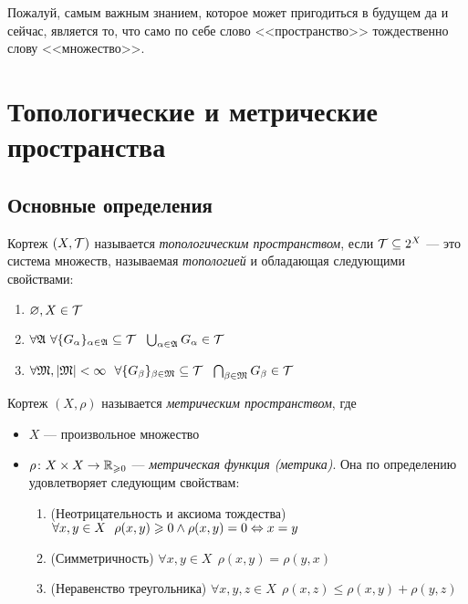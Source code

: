 \begin{anote}
	Пожалуй, самым важным знанием, которое может пригодиться в будущем да и сейчас, является то, что само по себе слово <<пространство>> тождественно слову <<множество>>.
\end{anote}

\section{Топологические и метрические пространства}

\subsection{Основные определения}

\begin{definition}
	Кортеж $(X, \mathcal{T})$ называется \textit{топологическим пространством}, если $\mathcal{T} \subseteq 2^X$ --- это система множеств, называемая \textit{топологией} и обладающая следующими свойствами:
	\begin{enumerate}
		\item $\varnothing, X \in \mathcal{T}$
		
		\item $\forall \mathfrak{A}\ \forall \{G_\alpha\}_{\alpha \in \mathfrak{A}} \subseteq \mathcal{T}\ \ \bigcup_{\alpha \in \mathfrak{A}} G_\alpha \in \mathcal{T}$
		
		\item $\forall \gM, |\gM| < \infty\ \ \forall \{G_\beta\}_{\beta \in \gM} \subseteq \Tau\ \ \bigcap_{\beta \in \gM} G_\beta \in \Tau$
	\end{enumerate}
\end{definition}

\begin{definition}
	Кортеж $(X, \rho)$ называется \textit{метрическим пространством}, где
	\begin{itemize}
		\item $X$ --- произвольное множество
		
		\item $\rho \colon X \times X \to \mathbb{R}_{\geqslant 0}$ --- \textit{метрическая функция (метрика)}. Она по определению удовлетворяет следующим свойствам:
		\begin{enumerate}
			\item (Неотрицательность и аксиома тождества) $\forall x, y \in X\ \ \rho(x, y) \geqslant 0 \wedge \rho(x, y) = 0 \Leftrightarrow x = y$
			
			\item (Симметричность) $\forall x, y \in X\ \ \rho(x, y) = \rho(y, x)$
			
			\item (Неравенство треугольника) $\forall x, y, z \in X\ \ \rho(x, z) \le \rho(x, y) + \rho(y, z)$
		\end{enumerate}
	\end{itemize}
\end{definition}

